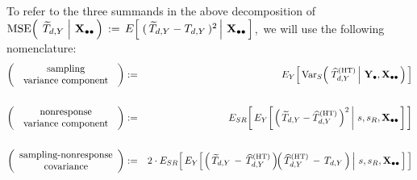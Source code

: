 \vskip 0.75cm
\noindent
To refer to the three summands in the above decomposition of
\,$
\textnormal{MSE}\!\left(\;
    \left.
    \widetilde{T}_{d,Y}
    \;\right\vert\,
    \mathbf{X}_{\bullet\bullet}
    \,\right)
\, := \,
    E\!\left[\,
        \left.
        (\,\widetilde{T}_{d,Y} - T_{d,Y}\,)^{2}
        \,\right\vert\,
        \mathbf{X}_{\bullet\bullet}
        \,\right]
$,\,
we will use the following nomenclature:
\vskip 0.01cm
\begin{eqnarray*}
\left(\begin{array}{c}
    \textnormal{sampling}
    \\
    \textnormal{\;\,variance component\;\,}
    \end{array}\right)
& := &
    E_{Y}\!\left[\,
    \Var_{S}\!\left(\,
        \left.
        \widehat{T}^{\textnormal{(HT)}}_{d,Y}
        \,\right\vert\,
        \Ydot,
        \Xobs
        \,\right)
        \,\right]
\\ \\
\left(\begin{array}{c}
    \textnormal{nonresponse}
    \\
    \textnormal{\;\,variance component\;\,}
    \end{array}\right)
& := &
    E_{SR}\!\left[\,
    E_{Y}\!\left[
        \left.
        \left(\,\widetilde{T}_{d,Y} - \widehat{T}^{\textnormal{(HT)}}_{d,Y}\,\right)^{2}
        \,\right\vert\,
        s,s_{R},\Xobs
        \,\right]
        \,\right]
\\ \\
\left(\begin{array}{c}
    \textnormal{sampling-nonresponse}
    \\
    \textnormal{covariance}
    \end{array}\right)
& := &
    2\cdot
    E_{SR}\!\left[\,
    E_{Y}\!\left[
        \left.
        \left(\,\widetilde{T}_{d,Y} \,-\, \widehat{T}^{\textnormal{(HT)}}_{d,Y}\,\right)
        \!\!
        \left(\,\widehat{T}^{\textnormal{(HT)}}_{d,Y} \,-\, T_{d,Y}\,\right)
        \,\right\vert\,
        s,s_{R},\Xobs
        \,\right]
        \,\right]
\end{eqnarray*}


